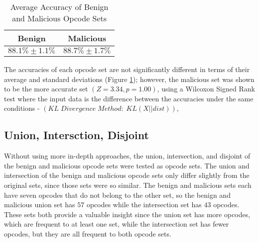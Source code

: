 \begin{table}[H]
    \begin{center}
        \captionsetup{justification=centering}
        \caption{Average Accuracy of Benign and Malicious Opcode Sets}
        \begin{tabular}{c|c}
            \textbf{Benign} & \textbf{Malicious}\\
            \hline
            $88.1\% \pm 1.1\%$ & $88.7\% \pm 1.7\%$ \\
        \end{tabular}
        \label{tab:benignMalicious}
    \end{center}
\end{table}

The accuracies of each opcode set are not significantly different in terms of their average and standard deviations
(Figure \ref{tab:benignMalicious}); however, the malicious set was shown to be the more accurate set
$(Z=3.34, p=1.00)$, using a Wilcoxon Signed Rank test  where the input data is the difference between the
accuracies under the same conditions - $(KL\; Divergence\; Method:\; KL(X||dist))$,



\subsection{Union, Intersction, Disjoint}
Without using more in-depth approaches, the union, intersection, and disjoint of the benign and malicious opcode sets
were tested as opcode sets.
The union and intersection of the benign and malicious opcode sets only differ slightly from the original
sets, since those sets were so similar.
The benign and malicious sets each have seven opcodes that do not belong to the other set, so the benign and
malicious union set has $57$ opcodes while the intersection set has $43$ opcodes.
These sets both provide a valuable insight since the union set has more opcodes, which are frequent to at least one set,
while the intersection set has fewer opcodes, but they are all frequent to both opcode sets.


